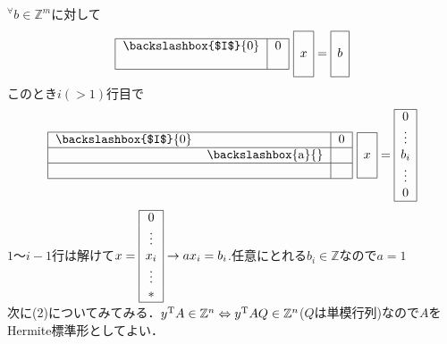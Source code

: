 ${}^{\forall}b\in{\mathbb{Z}}^m$に対して
\begin{equation}
  \begin{tabular}{|c|c|}
    \hline
    \backslashbox{$I$}{0}&0\\
    &\\\hline
  \end{tabular}\
  \begin{array}{|c|}
    \hline
    \\
    x\\
    \\\hline
  \end{array}=
  \begin{array}{|c|}
    \hline
    \\
    b\\
    \\\hline
  \end{array}
\end{equation}
このとき$i(>1)$行目で
\begin{equation}
  \begin{tabular}{|cc|c|}
    \hline
    \backslashbox{$I$}{0}&&0\\\hline
    &\backslashbox{a}{}&\\\hline
    &&\\\hline
  \end{tabular}\
  \begin{array}{|c|}
    \hline
    \\
    x\\
    \\\hline
  \end{array}=
  \begin{array}{|c|}
    \hline
    0\\
    \vdots\\
    b_i\\
    \vdots\\
    0
    \\\hline
  \end{array}
\end{equation}
$1～i-1$行は解けて$x=
\begin{array}{|c|}
  \hline
  0\\
  \vdots\\
  x_i\\
  \vdots\\
  \ast
  \\\hline
\end{array}\to ax_i =b_i $.任意にとれる$b_i\in\mathbb{Z}$なので$a=1$
\\
次に(2)についてみてみる．${y}^{\mathrm{T}}A\in{\mathbb{Z}}^n \Leftrightarrow{y}^{\mathrm{T}}AQ\in{\mathbb{Z}}^n$($Q$は単模行列)なので$A$をHermite標準形としてよい．

